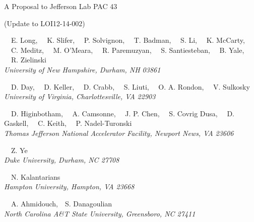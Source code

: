 \begin{center}
A Proposal to Jefferson Lab PAC 43

(Update to LOI12-14-002)

\vspace{15px}

\setcounter{footnote}{\SPOKES}
%
{~~E. Long,\setcounter{footnote}{\SPOKES}
\setcounter{footnote}{\SPOKES}\footnotemark {}
\setcounter{footnote}{\CONTACT}\footnotemark{}
~~K. Slifer,\setcounter{footnote}{\SPOKES}\footnotemark
~~P. Solvignon,\setcounter{footnote}{\SPOKES}\footnotemark
~~T. Badman,
~~S. Li,
~~K. McCarty,
~~C. Meditz,
~~M. O'Meara,
~~R. Paremuzyan,
~~S. Santiesteban,
~~B. Yale,
~~R. Zielinski
}\\
\ls
{\normalsize\it{University of New Hampshire, Durham, NH 03861}}

\vspace{10px}

{~~D. Day,\setcounter{footnote}{\SPOKES}\footnotemark
~~D. Keller,\setcounter{footnote}{\SPOKES}\footnotemark
~~D. Crabb,
~~S. Liuti,
~~O. A. Rondon,
~~V. Sulkosky}\\
\ls
{\normalsize\it{University of Virginia, Charlottesville, VA 22903}}

\vspace{10px}

{~~D. Higinbotham\setcounter{footnote}{\SPOKES}\footnotemark,
~~A. Camsonne,
~~J. P. Chen,
~~S. Covrig Dusa,
~~D. Gaskell,
~~C. Keith,
~~P. Nadel-Turonski}\\
\ls
{\normalsize\it{Thomas Jefferson National Accelerator Facility, Newport News, VA 23606}}

\vspace{10px}

{~~Z. Ye}\\
\ls
{\normalsize\it{Duke University, Durham, NC 27708}}

\vspace{10px}

{~~N. Kalantarians}\\
\ls
{\normalsize\it{Hampton University, Hampton, VA 23668}}

\vspace{10px}

{~~A. Ahmidouch,~~S. Danagoulian}\\
\ls
{\normalsize\it{North Carolina A\&T State University, Greensboro, NC 27411}}


\end{center}
